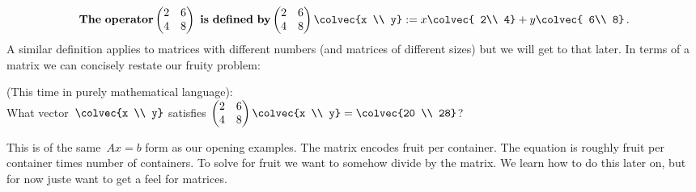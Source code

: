 \begin{equation*}
 {\rm {\bf The~operator}}   \begin{pmatrix}
      2     & 6 \\
      4     & 8
    \end{pmatrix}~{\rm {\bf is~defined~by}}
    \begin{pmatrix}
      2     & 6 \\
      4     & 8
    \end{pmatrix}
  \colvec{x \\ y}
  := x \colvec{ 2\\ 4} + y \colvec{ 6\\ 8} \, .
\end{equation*}
A similar definition applies to matrices with different numbers (and matrices of different sizes) but we will get to that later. 
In terms of a matrix we can concisely restate our fruity problem:
\begin{example}  (This time in purely mathematical language): \\[.2cm]
What vector~$  \colvec{x \\ y}$ satisfies 
$
    \begin{pmatrix}
      2     & 6 \\
      4     & 8
    \end{pmatrix}
  \colvec{x \\ y}
  =   \colvec{20 \\ 28}
$?
\end{example}
This is of the same~$Ax=b$ form as our opening examples. 
The matrix encodes fruit per container. The equation is roughly fruit per container times number of containers. To solve for fruit we want to \hypertarget{ch1divide}{somehow divide} by the matrix. We learn how to do this later on, but for now juste want to get a feel for matrices.


